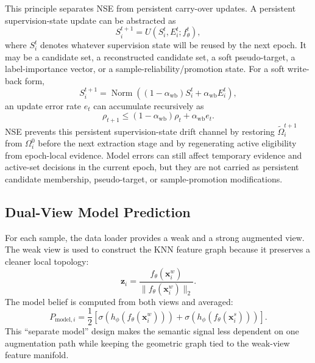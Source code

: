 This principle separates NSE from persistent carry-over updates. A persistent
supervision-state update can be abstracted as
\begin{equation}
    S_i^{t+1}
    =
    U\left(S_i^t,E_i^t;f_\theta^t\right),
    \label{eq:write_back_source}
\end{equation}
where $S_i^t$ denotes whatever supervision state will be reused by the next
epoch. It may be a candidate set, a reconstructed candidate set, a soft
pseudo-target, a label-importance vector, or a sample-reliability/promotion
state. For a
soft write-back form,
\begin{equation}
    S_i^{t+1}
    =
    \operatorname{Norm}\!\left(
    (1-\alpha_{\mathrm{wb}})S_i^t+\alpha_{\mathrm{wb}} E_i^t
    \right),
    \label{eq:soft_write_back}
\end{equation}
an update error rate $e_t$ can accumulate recursively as
\begin{equation}
    \rho_{t+1} \le (1-\alpha_{\mathrm{wb}})\rho_t+\alpha_{\mathrm{wb}} e_t.
    \label{eq:source_contamination}
\end{equation}
NSE prevents this persistent supervision-state drift channel by restoring
$\tilde{\Omega}_i^{t+1}$ from $\Omega_i^0$ before the next extraction stage and
by regenerating active eligibility from epoch-local evidence. Model errors can
still affect temporary evidence and active-set decisions in the current epoch,
but they are not carried as persistent candidate membership, pseudo-target, or
sample-promotion modifications.

\subsection{Dual-View Model Prediction}
For each sample, the data loader provides a weak and a strong augmented view.
The weak view is used to construct the KNN feature graph because it preserves a
cleaner local topology:
\begin{equation}
    \mathbf{z}_i = \frac{f_\theta(\mathbf{x}^{w}_i)}
    {\|f_\theta(\mathbf{x}^{w}_i)\|_2}.
\end{equation}
The model belief is computed from both views and averaged:
\begin{equation}
    P_{\mathrm{model},i}
    =
    \frac{1}{2}
    \left[
    \sigma(h_\phi(f_\theta(\mathbf{x}^{w}_i)))+
    \sigma(h_\phi(f_\theta(\mathbf{x}^{s}_i)))
    \right].
    \label{eq:dual_view_model}
\end{equation}
This ``separate model'' design makes the semantic signal less dependent on one
augmentation path while keeping the geometric graph tied to the weak-view
feature manifold.

